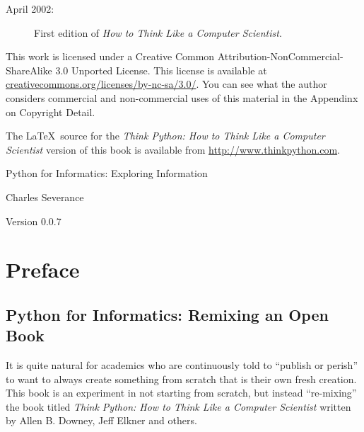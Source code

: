 \documentclass[11pt]{book}
\newcommand{\thetitle}{Python for Informatics: Exploring Information}
\newcommand{\theversion}{0.0.7}
\begin{document}
\begin{latexonly}
{\begin{description}
\item[April 2002:] First edition of \emph{How to Think Like
a Computer Scientist}.

\end{description}

\vspace{0.2in}

This work is licensed under a 
Creative Common
Attribution-NonCommercial-ShareAlike 3.0 Unported License.
This license is 
available at
\url{creativecommons.org/licenses/by-nc-sa/3.0/}.  You can 
see what the author considers commercial and non-commercial
uses of this material in the Appendinx on Copyright Detail.

The \LaTeX\ source for the 
\emph{Think Python: How to Think Like
a Computer Scientist}
version of this book is available from
\url{http://www.thinkpython.com}.

\vspace{0.2in}

} %

\end{latexonly}



\begin{htmlonly}


{\Large \thetitle}

{\large 
Charles Severance}

Version \theversion

\setcounter{chapter}{-1}

\end{htmlonly}

\chapter{Preface}

\section*{Python for Informatics: Remixing an Open Book}

It is quite natural for academics who are continuously told to 
``publish or perish'' to want to always create something from scratch
that is their own fresh creation.   This book is an 
experiment in not starting from scratch, but instead ``re-mixing''
the book titled
\emph{Think Python: How to Think Like
a Computer Scientist}
written by Allen B. Downey, Jeff Elkner and others.
\end{document}
